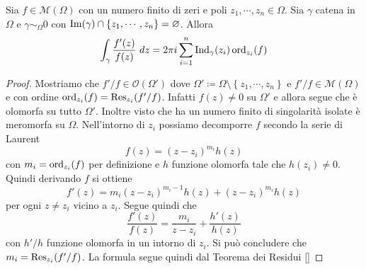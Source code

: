 \begin{theorem}
	\label{thr:principio_dell_argomento}
  Sia $f \in \mathcal{M}(\Omega)$ con un numero finito di zeri e poli $z_1,
  \cdots, z_n \in \Omega$. Sia $\gamma$ catena in $\Omega$ e $\gamma \sim_\Omega
  0$ con $\operatorname{Im}(\gamma) \cap \left\{ z_1, \cdots, z_n\right\} = \varnothing$.
  Allora 
  \begin{equation*}
    \int_{\gamma} \frac{f'(z)}{f(z)}\ dz = 2\pi i \sum_{i=1}^{n}
    \operatorname{Ind}_\gamma(z_i) \operatorname{ord}_{z_i}(f)
  \end{equation*}
\end{theorem}
\begin{proof}
  Mostriamo che $f'/ f \in \mathcal{O}(\Omega')$ dove $\Omega' \coloneqq \Omega
  \setminus \left\{ z_1, \cdots, z_n \right\}$ e $f'/f \in \mathcal{M}(\Omega)$
  e con ordine $\operatorname{ord}_{z_i}(f) = \operatorname{Res}_{z_i}(f'/f)$.
  Infatti $f(z) \neq 0$ su $\Omega'$ e allora segue che è olomorfa su tutto
  $\Omega'$. Inoltre visto che ha un numero finito di singolarità isolate
  è meromorfa su $\Omega$. Nell'intorno di $z_i$ possiamo decomporre $f$ secondo
  la serie di Laurent
  \begin{equation*}
    f(z) = (z-z_i)^{m_i}h(z) 
  \end{equation*}
  con $m_i = \operatorname{ord}_{z_i}(f)$ per definizione e $h$ funzione olomorfa tale che
  $h(z_i) \neq 0$. Quindi derivando $f$ si ottiene 
  \begin{equation*}
    f'(z) = m_i(z-z_i)^{m_i-1}h(z) + (z-z_i)^{m_i}h(z)
  \end{equation*}
  per ogni $z \neq z_i$ vicino a $z_i$. Segue quindi che 
  \begin{equation*}
    \frac{f'(z)}{f(z)} = \frac{m_i}{z-z_i} + \frac{h'(z)}{h(z)}
  \end{equation*}
  con $h'/h$ funzione olomorfa in un intorno di $z_i$. Si può concludere che
  $m_i = \operatorname{Res}_{z_i}(f'/f)$. La formula segue quindi dal Teorema dei Residui \ref{} 
\end{proof}

